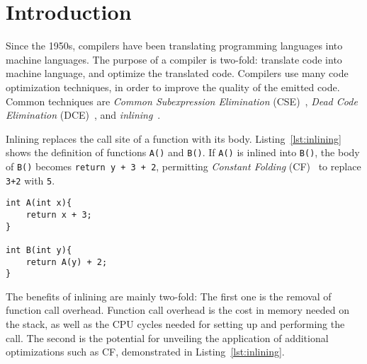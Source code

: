 
\section{Introduction}
\label{introduction}

Since the 1950s, compilers have been translating  programming
languages into machine languages. The purpose of a compiler is two-fold:
translate  code into machine language, and optimize the translated
code. Compilers use many code optimization techniques, in order to improve the
quality of the emitted code. Common techniques are \textit{Common Subexpression
Elimination} (CSE)~\cite[Ch. 8.5]{DragonBook}, \textit{Dead Code Elimination}
(DCE)~\cite[Ch. 8.5]{DragonBook}, and \textit{inlining}~\cite[Ch.
12.1]{DragonBook}.

Inlining replaces the call site of a function with its body.
Listing~\ref{lst:inlining} shows the definition of functions \lstinline!A()! and
\lstinline!B()!. If \lstinline!A()! is inlined into \lstinline!B()!, the body of
\lstinline!B()! becomes \lstinline!return y + 3 + 2!, permitting
\textit{Constant Folding} (CF)~\cite[Ch. 8.5]{DragonBook} to replace
\lstinline!3+2! with \lstinline!5!.

\begin{centering}
	\noindent\begin{minipage}{\textwidth}
		\begin{CenteredBox}
		\begin{lstlisting}[style=global_customcpp]
int A(int x){
	return x + 3;
}

int B(int y){
	return A(y) + 2;
}
		\end{lstlisting}
		\end{CenteredBox}
	\end{minipage}
	\label{lst:inlining}
\end{centering}

The benefits of inlining are mainly two-fold: The first one is the removal of
function call overhead. Function call overhead is the cost in memory needed on
the stack, as well as the CPU cycles needed for setting up and performing the
call. The second is the potential for unveiling the application of additional
optimizations such as CF, demonstrated in Listing~\ref{lst:inlining}.

